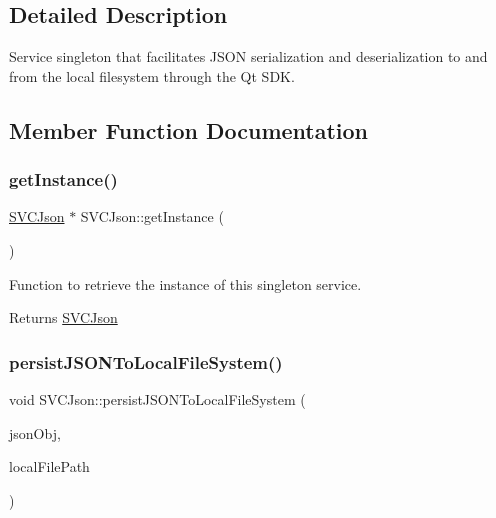 \subsection{Detailed Description}
Service singleton that facilitates J\+S\+ON serialization and deserialization to and from the local filesystem through the Qt S\+DK. 



\subsection{Member Function Documentation}
\mbox{\label{class_s_v_c_json_a309123d2e8f34ba0ec02e73b024d53e5}} 
\subsubsection{\texorpdfstring{getInstance()}{getInstance()}}
{\footnotesize\ttfamily \mbox{\hyperlink{class_s_v_c_json}{S\+V\+C\+Json}} $\ast$ S\+V\+C\+Json\+::get\+Instance (\begin{DoxyParamCaption}{ }\end{DoxyParamCaption})\hspace{0.3cm}{\ttfamily [static]}}



Function to retrieve the instance of this singleton service. 

\begin{DoxyReturn}{Returns}
\mbox{\hyperlink{class_s_v_c_json}{S\+V\+C\+Json}} 
\end{DoxyReturn}
\mbox{\label{class_s_v_c_json_a0977d01535e63b2cc76a0fb35cc17966}} 
\subsubsection{\texorpdfstring{persistJSONToLocalFileSystem()}{persistJSONToLocalFileSystem()}\hspace{0.1cm}{\footnotesize\ttfamily [1/2]}}
{\footnotesize\ttfamily void S\+V\+C\+Json\+::persist\+J\+S\+O\+N\+To\+Local\+File\+System (\begin{DoxyParamCaption}\item[{Q\+Json\+Object}]{json\+Obj,  }\item[{Q\+String}]{local\+File\+Path }\end{DoxyParamCaption})}



